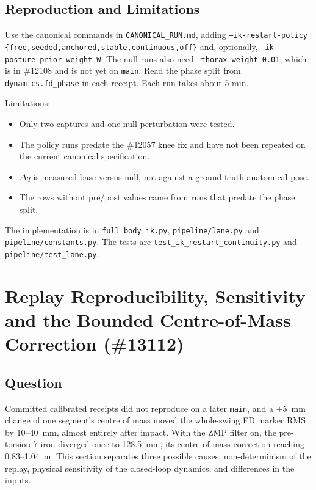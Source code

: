 \documentclass[11pt,a4paper]{article}
\begin{document}
\subsection{Reproduction and Limitations}
Use the canonical commands in \texttt{CANONICAL\_RUN.md}, adding
\texttt{--ik-restart-policy \{free,seeded,anchored,stable,continuous,off\}}
and, optionally, \texttt{--ik-posture-prior-weight W}. The null runs also need
\texttt{--thorax-weight 0.01}, which is in \#12108 and is not yet on
\texttt{main}. Read the phase split from \texttt{dynamics.fd\_phase} in each
receipt. Each run takes about 5 min.

Limitations:
\begin{itemize}
\item Only two captures and one null perturbation were tested.
\item The policy runs predate the \#12057 knee fix and have not been repeated
on the current canonical specification.
\item $\Delta q$ is measured base versus null, not against a ground-truth
anatomical pose.
\item The rows without pre/post values came from runs that predate the phase
split.
\end{itemize}
The implementation is in \texttt{full\_body\_ik.py},
\texttt{pipeline/lane.py} and \texttt{pipeline/constants.py}. The tests are
\texttt{test\_ik\_restart\_continuity.py} and \texttt{pipeline/test\_lane.py}.

\section{Replay Reproducibility, Sensitivity and the Bounded Centre-of-Mass Correction (\#13112)}
\label{sec:replay_sensitivity}

\subsection{Question}
Committed calibrated receipts did not reproduce on a later \texttt{main}, and
a $\pm 5$~mm change of one segment's centre of mass moved the whole-swing FD
marker RMS by 10--40~mm, almost entirely after impact. With the ZMP filter
on, the pre-torsion 7-iron diverged once to 128.5~mm, its centre-of-mass
correction reaching 0.83--1.04~m. This section separates three possible
causes: non-determinism of the replay, physical sensitivity of the
closed-loop dynamics, and differences in the inputs.
\end{document}
